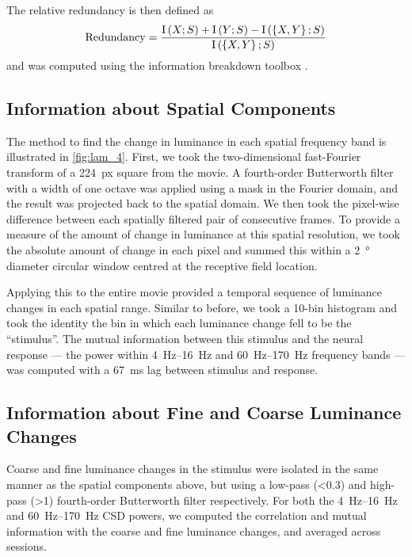 The relative redundancy is then defined as
\begin{equation*}
\operatorname{Redundancy}=\frac{\operatorname{I}\left(X;S\right)+\operatorname{I}\left(Y;S\right)-\operatorname{I}\left(\left\{X,Y\right\};S\right)}{\operatorname{I}\left(\left\{X,Y\right\};S\right)}
\end{equation*}
and was computed using the information breakdown toolbox \citep{Magri2009}.


\subsection{Information about Spatial Components}

The method to find the change in luminance in each spatial frequency band is illustrated in \autoref{fig:lam_4}.
First, we took the two-dimensional fast-Fourier transform of a \SI{224}{px} square from the movie.
A fourth-order Butterworth filter with a width of one octave was applied using a mask in the Fourier domain, and the result was projected back to the spatial domain.
We then took the pixel-wise difference between each spatially filtered pair of consecutive frames.
To provide a measure of the amount of change in luminance at this spatial resolution, we took the absolute amount of change in each pixel and summed this within a \SI{2}{\degree} diameter circular window centred at the receptive field location.

Applying this to the entire movie provided a temporal sequence of luminance changes in each spatial range.
Similar to before, we took a \num{10}-bin histogram and took the identity the bin in which each luminance change fell to be the ``stimulus''.
The mutual information between this stimulus and the neural response --- the power within \SIrange{4}{16}{Hz} and \SIrange{60}{170}{Hz} frequency bands --- was computed with a \SI{67}{\milli\second} lag between stimulus and response.


\subsection{Information about Fine and Coarse Luminance Changes}

Coarse and fine luminance changes in the stimulus were isolated in the same manner as the spatial components above, but using a low-pass (\SI{<0.3}{\cpd}) and high-pass (\SI{>1}{\cpd}) fourth-order Butterworth filter respectively.
For both the \SIrange{4}{16}{Hz} and \SIrange{60}{170}{Hz} \ac{CSD} powers, we computed the correlation and mutual information with the coarse and fine luminance changes, and averaged across sessions.


